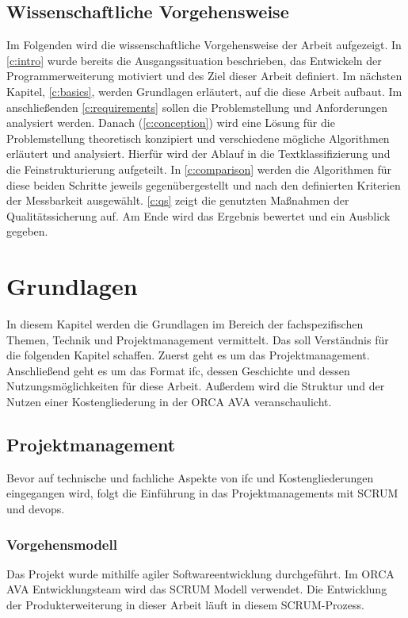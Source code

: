 \section{Wissenschaftliche Vorgehensweise}
\label{c:intro:methodology:scientific_proceture}
Im Folgenden wird die wissenschaftliche Vorgehensweise der Arbeit aufgezeigt.
In \autoref{c:intro} wurde bereits die Ausgangssituation beschrieben, das Entwickeln der Programmerweiterung motiviert und des Ziel dieser Arbeit definiert. Im nächsten Kapitel, \autoref{c:basics}, werden Grundlagen erläutert, auf die diese Arbeit aufbaut. Im anschließenden \autoref{c:requirements} sollen die Problemstellung und Anforderungen analysiert werden. Danach (\autoref{c:conception}) wird eine Lösung für die Problemstellung theoretisch konzipiert und verschiedene mögliche Algorithmen erläutert und analysiert. Hierfür wird der Ablauf in die Textklassifizierung und die Feinstrukturierung aufgeteilt. In \autoref{c:comparison} werden die Algorithmen für diese beiden Schritte jeweils gegenübergestellt und nach den definierten Kriterien der Messbarkeit ausgewählt. \autoref{c:qs} zeigt die genutzten Maßnahmen der Qualitätssicherung auf. Am Ende wird das Ergebnis bewertet und ein Ausblick gegeben.


\chapter{Grundlagen}
\label{c:basics}
In diesem Kapitel werden die Grundlagen im Bereich der fachspezifischen Themen, Technik und Projektmanagement vermittelt. Das soll Verständnis für die folgenden Kapitel schaffen. Zuerst geht es um das Projektmanagement. Anschließend geht es um das Format \ac{ifc}, dessen Geschichte und dessen Nutzungsmöglichkeiten für diese Arbeit. Außerdem wird die Struktur und der Nutzen einer Kostengliederung in der ORCA AVA veranschaulicht.

\section{Projektmanagement}
\label{c:basics:project-management}
Bevor auf technische und fachliche Aspekte von \ac{ifc} und Kostengliederungen eingegangen wird, folgt die Einführung in das Projektmanagements mit SCRUM und \ac{devops}.

\subsection{Vorgehensmodell}
\label{c:basics:project-management:procedure_model}
Das Projekt wurde mithilfe agiler Softwareentwicklung durchgeführt. Im ORCA AVA Entwicklungsteam wird das SCRUM Modell verwendet. Die Entwicklung der Produkterweiterung in dieser Arbeit läuft in diesem SCRUM-Prozess.

